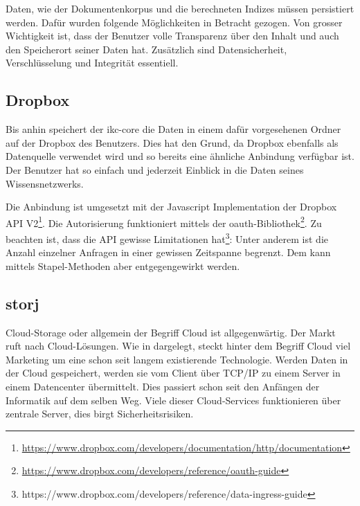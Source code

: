 
Daten, wie der Dokumentenkorpus und die berechneten Indizes müssen persistiert werden. Dafür wurden folgende Möglichkeiten in Betracht gezogen. Von grosser Wichtigkeit ist, dass der Benutzer volle Transparenz über den Inhalt und auch den Speicherort seiner Daten hat. Zusätzlich sind Datensicherheit, Verschlüsselung und Integrität essentiell.


\subsection{Dropbox}

Bis anhin speichert der \gls{ikc-core} die Daten in einem dafür vorgesehenen Ordner auf der Dropbox des Benutzers. Dies hat den Grund, da Dropbox ebenfalls als Datenquelle verwendet wird und so bereits eine ähnliche Anbindung verfügbar ist. Der Benutzer hat so einfach und jederzeit Einblick in die Daten seines Wissensnetzwerks.

Die Anbindung ist umgesetzt mit der Javascript Implementation der Dropbox API V2\footnote{\url{https://www.dropbox.com/developers/documentation/http/documentation}}. Die Autorisierung funktioniert mittels der oauth-Bibliothek\footnote{\url{https://www.dropbox.com/developers/reference/oauth-guide}}. Zu beachten ist, dass die API gewisse Limitationen hat\footnote{https://www.dropbox.com/developers/reference/data-ingress-guide}: Unter anderem ist die Anzahl einzelner Anfragen in einer gewissen Zeitspanne begrenzt. Dem kann mittels Stapel-Methoden aber entgegengewirkt werden.


\subsection{storj}

Cloud-Storage oder allgemein der Begriff Cloud ist allgegenwärtig. Der Markt ruft nach Cloud-Lösungen. Wie in \cite[S.~1-3]{wilkinson2014metadisk} dargelegt, steckt hinter dem Begriff Cloud viel Marketing um eine schon seit langem existierende Technologie. Werden Daten in der Cloud gespeichert, werden sie vom Client über TCP/IP zu einem Server in einem Datencenter übermittelt. Dies passiert schon seit den Anfängen der Informatik auf dem selben Weg. Viele dieser Cloud-Services funktionieren über zentrale Server, dies birgt Sicherheitsrisiken.

